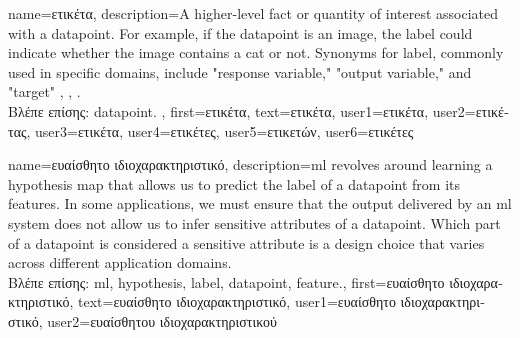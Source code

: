 {name={\foreignlanguage{greek}{ετικέτα}},
	description={A higher-level fact or quantity of interest associated with a \gls{datapoint}. 
		For example, if the \gls{datapoint} is an image, the label could indicate whether the 
		image contains a cat or not. Synonyms for label, commonly used in specific domains, 
		include "response variable," "output variable," and "target" \cite{Gujarati2021}, \cite{Dodge2003}, \cite{Everitt2022}.\\
		\foreignlanguage{greek}{Βλέπε επίσης:} \gls{datapoint}.
 },
	first={\foreignlanguage{greek}{ετικέτα}},
	text={\foreignlanguage{greek}{ετικέτα}},
	user1={\foreignlanguage{greek}{ετικέτα}}, %
  	user2={\foreignlanguage{greek}{ετικέτας}}, %
	user3={\foreignlanguage{greek}{ετικέτα}}, %
	user4={\foreignlanguage{greek}{ετικέτες}}, %
  	user5={\foreignlanguage{greek}{ετικετών}}, %
	user6={\foreignlanguage{greek}{ετικέτες}} %
}

{name={\foreignlanguage{greek}{ευαίσθητο ιδιοχαρακτηριστικό}},
	description={\gls{ml} revolves around learning a \gls{hypothesis} map that allows 
		us to predict the \gls{label} of a \gls{datapoint} from its \gls{feature}s. In some 
		applications, we must ensure that the output delivered by an \gls{ml} system does 
		not allow us to infer sensitive attributes of a \gls{datapoint}. Which part 
		of a \gls{datapoint} is considered a sensitive attribute is a design 
		choice that varies across different application domains.\\
		\foreignlanguage{greek}{Βλέπε επίσης:} \gls{ml}, \gls{hypothesis}, \gls{label}, \gls{datapoint}, \gls{feature}.},
	first={\foreignlanguage{greek}{ευαίσθητο ιδιοχαρακτηριστικό}},
	text={\foreignlanguage{greek}{ευαίσθητο ιδιοχαρακτηριστικό}},
	user1={\foreignlanguage{greek}{ευαίσθητο ιδιοχαρακτηριστικό}}, %
    	user2={\foreignlanguage{greek}{ευαίσθητου ιδιοχαρακτηριστικού}} %
}


